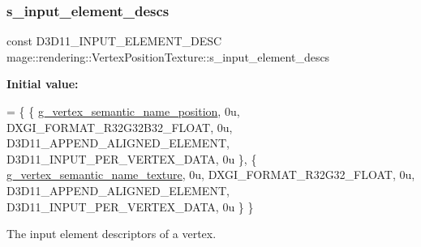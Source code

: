 \subsubsection{\texorpdfstring{s\+\_\+input\+\_\+element\+\_\+descs}{s\_input\_element\_descs}}
{\footnotesize\ttfamily const D3\+D11\+\_\+\+I\+N\+P\+U\+T\+\_\+\+E\+L\+E\+M\+E\+N\+T\+\_\+\+D\+E\+SC mage\+::rendering\+::\+Vertex\+Position\+Texture\+::s\+\_\+input\+\_\+element\+\_\+descs\hspace{0.3cm}{\ttfamily [static]}}

{\bfseries Initial value\+:}
\begin{DoxyCode}
= \{
        \{ \hyperlink{namespacemage_1_1rendering_ae0a999915bd61d5a9d8addc04fe0646a}{g\_vertex\_semantic\_name\_position}, 0u, DXGI\_FORMAT\_R32G32B32\_FLOAT, 
         0u, D3D11\_APPEND\_ALIGNED\_ELEMENT, D3D11\_INPUT\_PER\_VERTEX\_DATA, 0u \},
        \{ \hyperlink{namespacemage_1_1rendering_a6db7535ff83c660f8b7ce8eed50178c6}{g\_vertex\_semantic\_name\_texture},  0u, DXGI\_FORMAT\_R32G32\_FLOAT,     
        0u, D3D11\_APPEND\_ALIGNED\_ELEMENT, D3D11\_INPUT\_PER\_VERTEX\_DATA, 0u \}
    \}
\end{DoxyCode}
The input element descriptors of a vertex. 